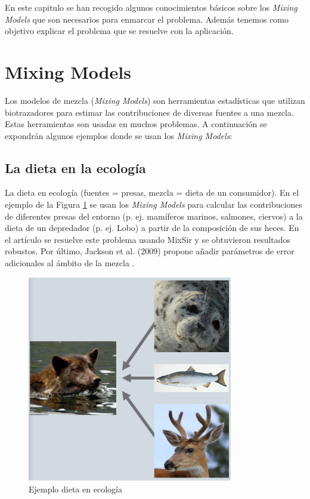 
En este capitulo se han recogido algunos conocimientos básicos sobre los \emph{Mixing Models} que son necesarios para enmarcar el problema. Además tenemos como objetivo explicar el problema que se resuelve con la aplicación.

\section{Mixing Models}

Los modelos de mezcla (\emph{Mixing Models}) son herramientas estadísticas que utilizan biotrazadores para estimar las contribuciones de diversas fuentes a una mezcla.
Estas herramientas son usadas en muchos problemas. A continuación se expondrán algunos ejemplos donde se usan los \emph{Mixing Models}:


\subsection{La dieta en la ecología}

La dieta en ecología  (fuentes = presas, mezcla = dieta de un consumidor). En el ejemplo de la Figura \ref{fig:preyDiet} se usan los \emph{Mixing Models} para calcular las contribuciones de diferentes presas del entorno (p. ej. mamíferos marinos, salmones, ciervos) a la dieta de un depredador (p. ej. Lobo) a partir de la composición de sus heces. En el artículo \cite{improveBayes2009} se resuelve este problema usando MixSir y se obtuvieron resultados robustos. Por último, Jackson et al. (2009) \cite{improveBayes2009} propone añadir parámetros de error adicionales al ámbito de la mezcla .

\begin{figure}[h!] 
\centering
    \includegraphics[width=0.8\textwidth]{img/preyDiet.PNG}
\caption{Ejemplo dieta en ecología }
\label{fig:preyDiet}
\end{figure}

